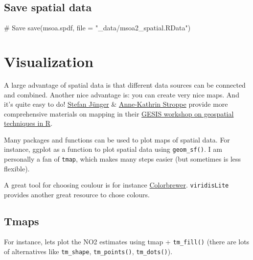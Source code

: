 \documentclass[
  letterpaper,
  DIV=11,
  numbers=noendperiod]{scrreprt}
\newenvironment{Shaded}{\begin{snugshade}}{\end{snugshade}}
\newcommand{\AttributeTok}[1]{\textcolor[rgb]{0.40,0.45,0.13}{#1}}
\newcommand{\CommentTok}[1]{\textcolor[rgb]{0.37,0.37,0.37}{#1}}
\newcommand{\FunctionTok}[1]{\textcolor[rgb]{0.28,0.35,0.67}{#1}}
\newcommand{\NormalTok}[1]{\textcolor[rgb]{0.00,0.23,0.31}{#1}}
\newcommand{\StringTok}[1]{\textcolor[rgb]{0.13,0.47,0.30}{#1}}
\begin{document}
\hypertarget{save-spatial-data}{%
\subsection{Save spatial data}\label{save-spatial-data}}

\begin{Shaded}
\begin{Highlighting}[]
\CommentTok{\# Save}
\FunctionTok{save}\NormalTok{(msoa.spdf, }\AttributeTok{file =} \StringTok{"\_data/msoa2\_spatial.RData"}\NormalTok{)}
\end{Highlighting}
\end{Shaded}

\hypertarget{visualization}{%
\section{Visualization}\label{visualization}}

A large advantage of spatial data is that different data sources can be
connected and combined. Another nice advantage is: you can create very
nice maps. And it's quite easy to do!
\href{https://stefanjuenger.github.io/}{Stefan Jünger} \&
\href{https://www.gesis.org/institut/mitarbeitendenverzeichnis/person/Anne-Kathrin.Stroppe}{Anne-Kathrin
Stroppe} provide more comprehensive materials on mapping in their
\href{https://github.com/StefanJuenger/gesis-workshop-geospatial-techniques-R-2023}{GESIS
workshop on geospatial techniques in R}.

Many packages and functions can be used to plot maps of spatial data.
For instance, ggplot as a function to plot spatial data using
\texttt{geom\_sf()}. I am personally a fan of \texttt{tmap}, which makes
many steps easier (but sometimes is less flexible).

A great tool for choosing coulour is for instance
\href{https://colorbrewer2.org/}{Colorbrewer}. \texttt{viridisLite}
provides another great resource to chose colours.

\hypertarget{tmaps}{%
\subsection{Tmaps}\label{tmaps}}

For instance, lets plot the NO2 estimates using tmap +
\texttt{tm\_fill()} (there are lots of alternatives like
\texttt{tm\_shape}, \texttt{tm\_points()}, \texttt{tm\_dots()}).
\end{document}
